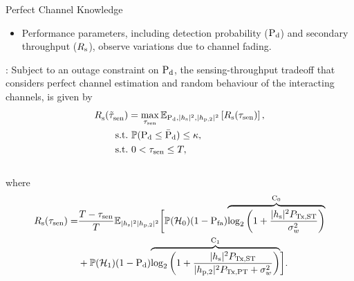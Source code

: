 \documentclass[12pt]{beamer}
\newcommand{\fs}[2]{\fontsize{#1 pt}{#2}\selectfont}
\begin{document}
\begin{frame}{Perfect Channel Knowledge}
	\fs{8}{8}
                \begin{center}
		\begin{itemize}
                \item Performance parameters, including detection probability ($\text{P}_{\text{d}}$) and secondary throughput ($R_{\text{s}}$), observe variations due to channel fading. \\[0.1cm] 
                \end{itemize}
                \begin{mdframed}[style=MyFrame, frametitle=Ideal Model (IM)] : Subject to an outage constraint on $\text{P}_{\text{d}}$, the sensing-throughput tradeoff that considers perfect channel estimation and random behaviour of the interacting channels, is given by
                \begin{align*}
               		{R}_{\text{s}}^{\text{}}(\tilde{\tau}_{\text{sen}}^{\text{}}) &= \operatorname*{max}_{\tau_{\text{sen}}} {\mathbb E}_{\text{P}_{\text{d}}, |h_{\text{s}}|^2, |h_{\text{p,2}}|^2}\left[ R_{\text{s}}(\tau_{\text{sen}}) \right], \\
			\text{s.t.} & \text{ }  \mathbb P( \text{P}_{\text{d}} \le \bar{\text{P}}_{\text{d}}) \le \kappa,  \\ 
			\text{s.t.} & \text{ }  0 < \tau_{\text{sen}} \le T, 
		\end{align*} \\[-0.6cm] 
		where\\[-0.7cm] 
		\begin{align*}
			R_{\text{s}}(\tau_{\text{sen}}) =& \frac{T - \tau_{\text{sen}}}{T} \mathbb{E}_{|h_{\text{s}}|^2 |h_{\text{p,2}}|^2} \bigg[ \mathbb P(\mathcal{H}_0) (1 - \text{P}_{\text{fa}}) \smash[b]{\overbrace{\log_2 \bigg( 1 + \frac{|h_{\text{s}}|^2 P_{\text{Tx,ST}}}{\sigma^2_{w}} \bigg)}^{\text{C}_0}} \\ &+ \mathbb P(\mathcal{H}_1) (1 - \text{P}_{\text{d}}) \smash[b]{\overbrace{\log_2 \bigg( 1 + \frac{|h_{\text{s}}|^2 P_{\text{Tx,ST}}}{|h_{\text{p,2}}|^2 P_{\text{Tx,PT}} + \sigma^2_{w}} \bigg)}^{\text{C}_1}} \bigg]. 
			\end{align*}

		\end{mdframed}
                \end{center}
\end{frame}
\end{document}
